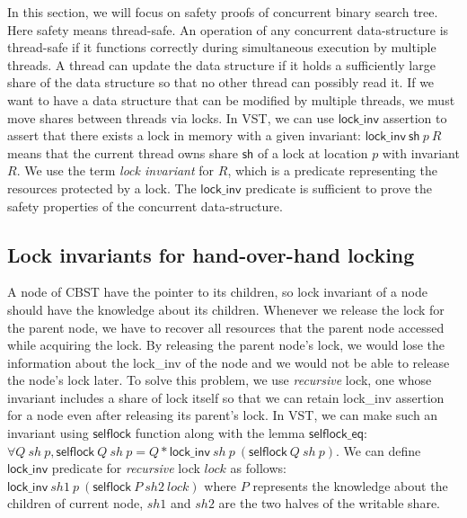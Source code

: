 \documentclass[acmsmall,screen]{acmart}\settopmatter{printfolios=true}
\begin{document}
In this section, we will focus on safety proofs of concurrent binary search tree. Here safety means thread-safe. An operation of any concurrent data-structure is thread-safe if it functions correctly during simultaneous execution by multiple threads. A thread can update the data structure if it holds a sufficiently large share of the data structure so that no other thread can possibly read it. If we want to have a data structure that can be modified by multiple threads, we must move shares between threads via locks. In VST, we can use $\mathsf{lock\_inv}$ assertion to assert that there exists a lock in memory with a given invariant: $\mathsf{lock\_inv}\ \mathsf{sh}\ p\ R$ means that the current thread owns share $\mathsf{sh}$ of a lock at location $p$ with invariant $R$. We use the term \emph{lock invariant} for $R$, which is a predicate representing the resources protected by a lock. The $\mathsf{lock\_inv}$ predicate is sufficient to prove the safety properties of the concurrent data-structure. 

   
\subsection{Lock invariants for hand-over-hand locking}
A node of CBST have the pointer to its children, so lock invariant of a node should have the knowledge about its children.   
Whenever we release the lock for the parent node, we have to recover all resources that the parent node accessed while acquiring the lock. By releasing the parent node's lock, we would lose the information about the lock\_inv of the node and we would not be able to release the node's lock later. To solve this problem, we use \emph{recursive} lock, one whose invariant includes a share of lock itself so that we can retain lock\_inv assertion for a node even after releasing its parent's lock. In VST, we can make such an invariant using $\mathsf{selflock}$ function along with the lemma $\mathsf{selflock\_eq}$: $\forall Q\ \mathit{sh}\ p, \mathsf{selflock}\ Q\ \mathit{sh}\ p = Q * \mathsf{lock\_inv}\ \mathit{sh}\ p\ (\mathsf{selflock}\ Q\ \mathit{sh}\ p)$. We can define $\mathsf{lock\_inv}$ predicate for \emph{recursive} lock $\mathit{lock}$ as follows: $\mathsf{lock\_inv}\ \mathit{sh1}\ p\ (\mathsf{selflock}\ P\ \mathit{sh2}\ \mathit{lock})$ where $\mathit{P}$ represents the knowledge about the children of current node, $\mathit{sh1}$ and $\mathit{sh2}$ are the two halves of the writable share.
\end{document}
